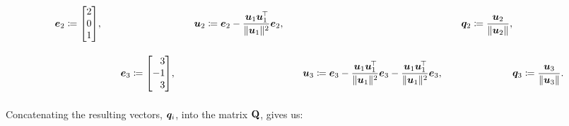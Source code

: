 \documentclass[11pt]{article}
\begin{document}
\begin{enumerate}
\begin{enumerate}[align=left]
\[\begin{alignedat}{3}
                            \vect{e}_2
                            \coloneq
                            \begin{bmatrix}
                                2 \\ 0 \\ 1
                            \end{bmatrix}
                            \! ,
                            \qquad
                             &   &
                            \vect{u}_2
                            \coloneq
                            \vect{e}_2
                            -
                            \frac{ \vect{u}_1 \vect{u}_1^{\T} }{ \norm{\vect{u}_1}^2 }
                            \vect{e}_2
                            ,
                            \qquad
                             &   &
                            \vect{q}_2
                            \coloneq
                            \frac{\vect{u}_2}{\norm{\vect{u}_2}}
                            ,
                            \\[1em]
                             &
                            \vect{e}_3
                            \coloneq
                            \begin{bmatrix*}[r]
                                3 \\ -1 \\ 3
                            \end{bmatrix*}
                            \! ,
                            \qquad
                             &   &
                            \vect{u}_3
                            \coloneq
                            \vect{e}_3
                            -
                            \frac{ \vect{u}_1 \vect{u}_1^{\T} }{ \norm{\vect{u}_1}^2 }
                            \vect{e}_3
                            -
                            \frac{ \vect{u}_1 \vect{u}_1^{\T} }{ \norm{\vect{u}_1}^2 }
                            \vect{e}_3
                            ,
                            \qquad
                             &   &
                            \vect{q}_3
                            \coloneq
                            \frac{\vect{u}_3}{\norm{\vect{u}_3}}
                            .
                            \\[1em]
                        \end{alignedat}
                    \]
                    Concatenating the resulting vectors, $\bm{q}_i$, into the matrix $\mathbf{Q}$, gives us:
                    \[
\]
\end{enumerate}
\end{enumerate}
\end{document}
